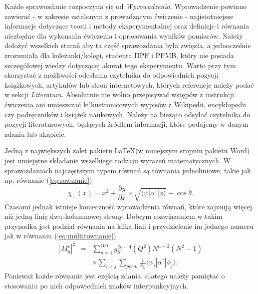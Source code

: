 \documentclass[twocolumn, a4paper, polish, 10pt]{article}
\begin{document}
Każde sprawozdanie rozpoczyna się od \emph{Wprowadzenia}. Wprowadzenie powinno zawierać - w zakresie ustalonym z prowadzącym ćwiczenie - najistotniejsze informacje dotyczące teorii i metody eksperymentalnej oraz definicje i równania niezbędne dla wykonania ćwiczenia i opracowania wyników pomiarów. Należy dołożyć wszelkich starań aby ta część sprawozdania była zwięzła, a jednocześnie zrozumiała dla koleżanki/kolegi, studenta IIPF i PFMB, który nie posiada szczegółowej wiedzy dotyczącej akurat tego eksperymentu. Warto przy tym skorzystać z możliwości odesłania czytelnika do odpowiednich pozycji książkowych, artykułów lub stron internetowych, których referencje należy podać w sekcji \emph{Literatura}. Absolutnie nie wolno przepisywać wstępów z instrukcji ćwiczenia ani umieszczać kilkustronicowych wypisów z Wikipedii, encyklopedii czy podręczników i książek naukowych. Należy na bieżąco odsyłać czytelnika do pozycji literaturowych, będących źródłem informacji, które podajemy w danym zdaniu lub akapicie.

Jedną z największych zalet pakietu \LaTeX\@ (w mniejszym stopniu pakietu Word) jest umiejętne składanie wszelkiego rodzaju wyrażeń matematycznych. W sprawozdaniach najczęstszym typem równań są równania jednoliniowe, takie jak np. równanie (\ref{eq:rownanie})
\begin{equation}
    \chi_+(x)=x^2+\frac{\partial y}{\partial x} \times \sqrt{\langle \psi |\alpha^\dag| \phi \rangle}-\cos\theta.
\label{eq:rownanie}
\end{equation}
Czasami jednak istnieje konieczność wprowadzenia równań, które zajmują więcej niż jedną linię dwu-kolumnowej strony. Dobrym rozwiązaniem w takim przypadku jest podział równania na kilka linii i przydzielenie im jednego numeru jak w równaniu (\ref{eq:multirownanie})
\begin{eqnarray}
    |M_g^v|^2 &=& \sum_{n=1}^{100}g_S^{2n-4}(Q^2) N^{n-2}(N^2-1)\nonumber\\
    && \times \sum_{i<j}\sum_{perm} \frac{1}{S_{ij}} \langle \psi_i |\alpha^\dag| \phi_j \rangle.
\label{eq:multirownanie}
\end{eqnarray}
Ponieważ każde równanie jest częścią zdania, dlatego należy pamiętać o stosowaniu po nich odpowiednich znaków interpunkcyjnych.
\end{document}
